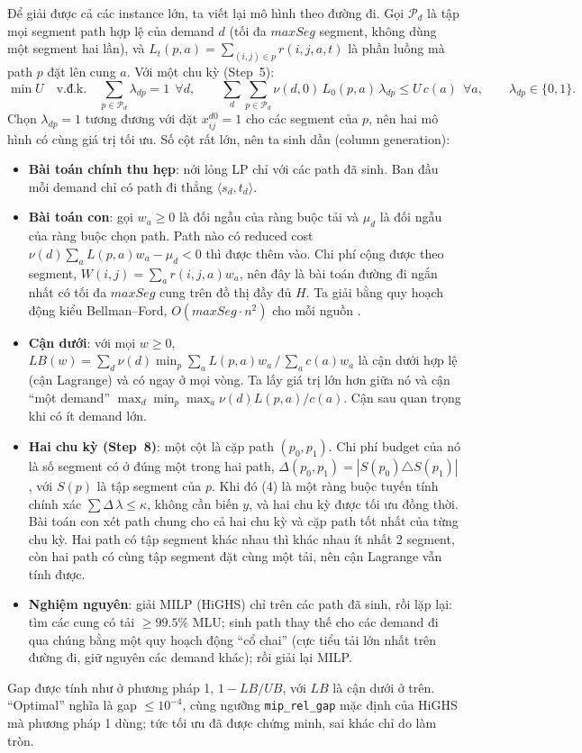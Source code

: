 \documentclass[11pt,a4paper]{article}
\begin{document}
Để giải được cả các instance lớn, ta viết lại mô hình theo đường đi.
Gọi $\mathcal P_d$ là tập mọi segment path hợp lệ của demand $d$ (tối đa $maxSeg$ segment, không dùng một segment hai lần), và $L_t(p,a)=\sum_{(i,j)\in p} r(i,j,a,t)$ là phần luồng mà path $p$ đặt lên cung $a$.
Với một chu kỳ (Step~5):
\begin{equation}
\min U\quad\text{v.đ.k.}\quad \sum_{p\in\mathcal P_d}\lambda_{dp}=1\ \ \forall d,\qquad
\sum_{d}\sum_{p\in\mathcal P_d}\nu(d,0)\,L_0(p,a)\,\lambda_{dp}\le U\,c(a)\ \ \forall a,\qquad \lambda_{dp}\in\{0,1\}.
\end{equation}
Chọn $\lambda_{dp}=1$ tương đương với đặt $x^{d0}_{ij}=1$ cho các segment của $p$, nên hai mô hình có cùng giá trị tối ưu.
Số cột rất lớn, nên ta sinh dần (column generation):
\begin{itemize}
\item \textbf{Bài toán chính thu hẹp}: nới lỏng LP chỉ với các path đã sinh. Ban đầu mỗi demand chỉ có path đi thẳng $\langle s_d,t_d\rangle$.
\item \textbf{Bài toán con}: gọi $w_a\ge0$ là đối ngẫu của ràng buộc tải và $\mu_d$ là đối ngẫu của ràng buộc chọn path. Path nào có reduced cost $\nu(d)\sum_a L(p,a)w_a-\mu_d<0$ thì được thêm vào. Chi phí cộng được theo segment, $W(i,j)=\sum_a r(i,j,a)w_a$, nên đây là bài toán đường đi ngắn nhất có tối đa $maxSeg$ cung trên đồ thị đầy đủ $H$. Ta giải bằng quy hoạch động kiểu Bellman--Ford, $O(maxSeg\cdot n^2)$ cho mỗi nguồn \cite{cg4sr}.
\item \textbf{Cận dưới}: với mọi $w\ge0$, $LB(w)=\sum_d\nu(d)\min_p\sum_a L(p,a)w_a\,/\,\sum_a c(a)w_a$ là cận dưới hợp lệ (cận Lagrange) và có ngay ở mọi vòng. Ta lấy giá trị lớn hơn giữa nó và cận ``một demand'' $\max_d\min_p\max_a \nu(d)L(p,a)/c(a)$. Cận sau quan trọng khi có ít demand lớn.
\item \textbf{Hai chu kỳ (Step~8)}: một cột là cặp path $(p_0,p_1)$. Chi phí budget của nó là số segment có ở đúng một trong hai path, $\Delta(p_0,p_1)=|S(p_0)\triangle S(p_1)|$, với $S(p)$ là tập segment của $p$. Khi đó (4) là một ràng buộc tuyến tính chính xác $\sum\Delta\,\lambda\le\kappa$, không cần biến $y$, và hai chu kỳ được tối ưu đồng thời. Bài toán con xét path chung cho cả hai chu kỳ và cặp path tốt nhất của từng chu kỳ. Hai path có tập segment khác nhau thì khác nhau ít nhất 2 segment, còn hai path có cùng tập segment đặt cùng một tải, nên cận Lagrange vẫn tính được.
\item \textbf{Nghiệm nguyên}: giải MILP (HiGHS) chỉ trên các path đã sinh, rồi lặp lại: tìm các cung có tải $\ge 99.5\%$ MLU; sinh path thay thế cho các demand đi qua chúng bằng một quy hoạch động ``cổ chai'' (cực tiểu tải lớn nhất trên đường đi, giữ nguyên các demand khác); rồi giải lại MILP.
\end{itemize}
Gap được tính như ở phương pháp 1, $1-LB/UB$, với $LB$ là cận dưới ở trên. ``Optimal'' nghĩa là gap $\le 10^{-4}$, cùng ngưỡng \texttt{mip\_rel\_gap} mặc định của HiGHS mà phương pháp 1 dùng; tức tối ưu đã được chứng minh, sai khác chỉ do làm tròn.
\end{document}
